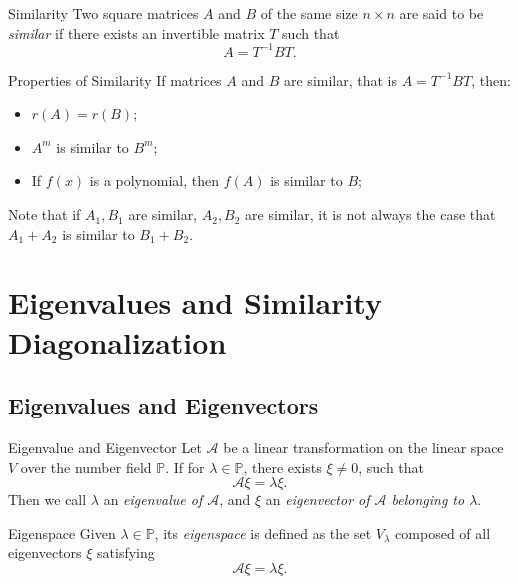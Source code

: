 \begin{definition}{Similarity}{}
  Two square matrices $A$ and $B$ of the same size $n \times n$ are said to be
  \emph{similar} if there exists an invertible matrix $T$ such that
  \begin{equation}
    A = T^{-1}BT.
  \end{equation}
\end{definition}

\begin{proposition}{Properties of Similarity}{}
  If matrices $A$ and $B$ are similar, that is $A = T^{-1}BT$,
  then:
  \begin{itemize}
  \item $r(A) = r(B)$;
  \item $A^m$ is similar to $B^{m}$;
  \item If $f(x)$ is a polynomial, then $f(A)$ is similar to $B$;
  \end{itemize}
\end{proposition}

\begin{note}
  Note that if $A_1, B_1$ are similar, $A_2, B_2$ are similar,
  it is not always the case that $A_1 + A_2$ is similar to $B_1 + B_2$.
\end{note}

\section{Eigenvalues and Similarity Diagonalization}

\subsection{Eigenvalues and Eigenvectors}

\begin{definition}{Eigenvalue and Eigenvector}{}
  Let $\mathcal{A}$ be a linear transformation on the linear space $V$ over the number
  field $\mathbb{P}$.
  If for $\lambda \in \mathbb{P}$, there exists $\xi \neq 0$,
  such that
  \begin{equation}
    \mathcal{A} \xi = \lambda \xi.
  \end{equation}
  Then we call $\lambda$ an \emph{eigenvalue of $\mathcal{A}$},
  and $\xi$ an \emph{eigenvector of $\mathcal{A}$ belonging to $\lambda$}.
\end{definition}

\begin{definition}{Eigenspace}{}
  Given $\lambda \in \mathbb{P}$,
  its \emph{eigenspace} is defined as the set $V_{\lambda}$
  composed of all eigenvectors $\xi$ satisfying
  \begin{equation}
    \mathcal{A} \xi = \lambda \xi.
  \end{equation}
\end{definition}

